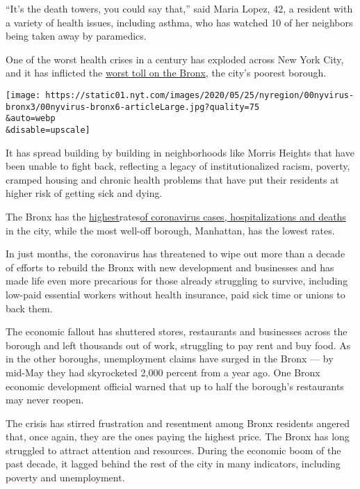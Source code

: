 ``It's the death towers, you could say that,'' said Maria Lopez, 42, a
resident with a variety of health issues, including asthma, who has
watched 10 of her neighbors being taken away by paramedics.

One of the worst health crises in a century has exploded across New York
City, and it has inflicted the
\href{https://www.nytimes.com/2020/06/24/nyregion/coronavirus-public-housing-new-york.html}{worst
toll on the Bronx}, the city's poorest borough.

\texttt{[image: https://static01.nyt.com/images/2020/05/25/nyregion/00nyvirus-bronx3/00nyvirus-bronx6-articleLarge.jpg?quality=75\\\&auto=webp\\\&disable=upscale]}

It has spread building by building in neighborhoods like Morris Heights
that have been unable to fight back, reflecting a legacy of
institutionalized racism, poverty, cramped housing and chronic health
problems that have put their residents at higher risk of getting sick
and dying.

The Bronx has the
\href{https://www.nytimes.com/2020/05/18/nyregion/coronavirus-deaths-nyc.html}{highest}rates\href{https://www.nytimes.com/2020/05/18/nyregion/coronavirus-deaths-nyc.html}{of
coronavirus cases, hospitalizations and deaths} in the city, while the
most well-off borough, Manhattan, has the lowest rates.

In just months, the coronavirus has threatened to wipe out more than a
decade of efforts to rebuild the Bronx with new development and
businesses and has made life even more precarious for those already
struggling to survive, including low-paid essential workers without
health insurance, paid sick time or unions to back them.

The economic fallout has shuttered stores, restaurants and businesses
across the borough and left thousands out of work, struggling to pay
rent and buy food. As in the other boroughs, unemployment claims have
surged in the Bronx --- by mid-May they had skyrocketed 2,000 percent
from a year ago. One Bronx economic development official warned that up
to half the borough's restaurants may never reopen.

The crisis has stirred frustration and resentment among Bronx residents
angered that, once again, they are the ones paying the highest price.
The Bronx has long struggled to attract attention and resources. During
the economic boom of the past decade, it lagged behind the rest of the
city in many indicators, including poverty and unemployment.

